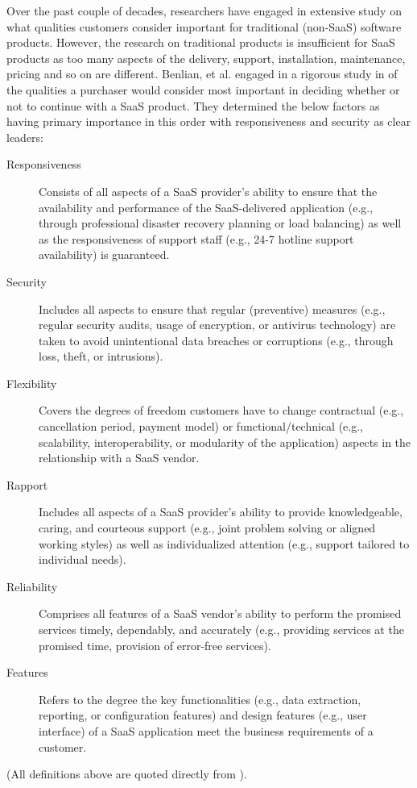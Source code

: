 \documentclass[10pt]{article}
\begin{document}
Over the past couple of decades, researchers have engaged in extensive study on what qualities customers consider important for traditional (non-SaaS) software products.
However, the research on traditional products is insufficient for SaaS products as too many aspects of the delivery, support, installation, maintenance, pricing and so on are different.
Benlian, et al. engaged in a rigorous study in \cite{saasqual} of the qualities a purchaser would consider most important in deciding whether or not to continue with a SaaS product.
They determined the below factors as having primary importance in this order with responsiveness and security as clear leaders:
\begin{description}
	\item[Responsiveness]
	Consists of all aspects of a SaaS provider’s ability to ensure that the availability and performance of the SaaS-delivered application (e.g., through professional disaster recovery planning or load balancing) as well as the responsiveness of support staff (e.g., 24-7 hotline support availability) is guaranteed.
	\item[Security]
	Includes all aspects to ensure that regular (preventive) measures (e.g., regular security audits, usage of encryption, or antivirus technology) are taken to avoid unintentional data breaches or corruptions (e.g., through loss, theft, or intrusions).
	\item[Flexibility]
	Covers the degrees of freedom customers have to change contractual (e.g., cancellation period, payment model) or functional/technical (e.g., scalability, interoperability, or modularity of the application) aspects in the relationship with a SaaS vendor.
	\item[Rapport]
	Includes all aspects of a SaaS provider’s ability to provide knowledgeable, caring, and courteous support (e.g., joint problem solving or aligned working styles) as well as individualized attention (e.g., support tailored to individual needs).
	\item[Reliability]
	Comprises all features of a SaaS vendor’s ability to perform the promised services timely, dependably, and accurately (e.g., providing services at the promised time, provision of error-free services).
	\item[Features]
	Refers to the degree the key functionalities (e.g., data extraction, reporting, or configuration features) and design features (e.g., user interface) of a SaaS application meet the business requirements of a customer.
\end{description}
(All definitions above are quoted directly from \cite{saasqual}).
\end{document}
